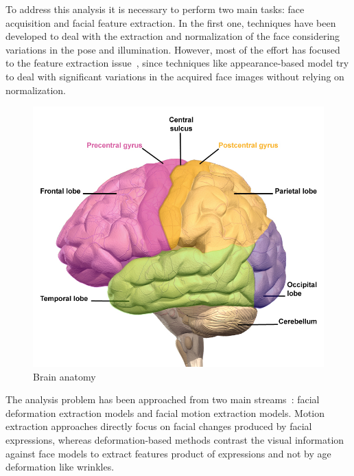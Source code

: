 To address this analysis it is necessary to perform two main tasks: face acquisition and facial feature extraction. In the first one, techniques have been developed to deal with the extraction and normalization of the face considering variations in the pose %
and illumination. %
However, most of the effort has focused to the feature extraction issue~\cite{Fasel2003}, since techniques like appearance-based model %
try to deal with significant variations in the acquired face images without relying on normalization.

\begin{figure}[ht]
    \centering
    \includegraphics[scale=1.0]{images/Figure6Brain.png}
    \caption{Brain anatomy}
    \label{fig:Brain anatomy}
\end{figure}

The analysis problem has been approached from two main streams~\cite{Fasel2003}: facial deformation extraction models and facial motion extraction models. Motion extraction approaches directly focus on facial changes produced by facial expressions, whereas deformation-based methods contrast the visual information against face models to extract features product of expressions and not by age deformation like wrinkles.

